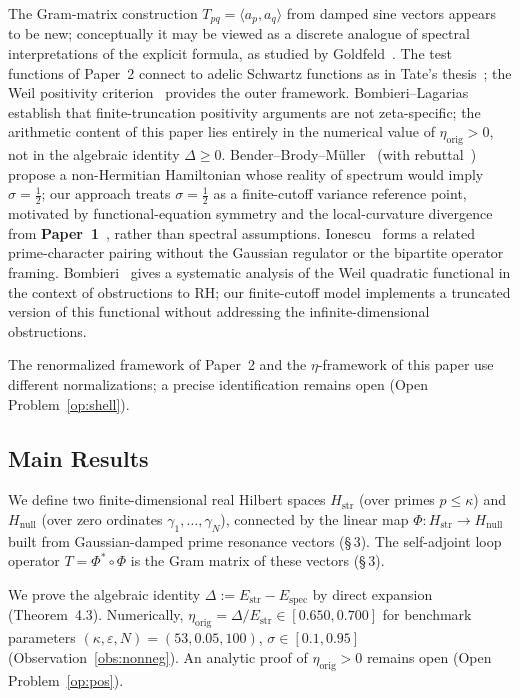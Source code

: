 \documentclass[11pt]{article}
\newcommand{\Hstr}{H_{\mathrm{str}}}
\newcommand{\Hnull}{H_{\mathrm{null}}}
\newcommand{\Estr}{E_{\mathrm{str}}}
\newcommand{\Espec}{E_{\mathrm{spec}}}
\newcommand{\etaorig}{\eta_{\mathrm{orig}}}
\begin{document}
The Gram-matrix construction $T_{pq}=\langle a_p,a_q\rangle$ from
damped sine vectors appears to be new; conceptually it may be viewed
as a discrete analogue of spectral interpretations of the explicit
formula, as studied by Goldfeld~\cite{Goldfeld}. The test functions of
Paper~2 connect to adelic Schwartz functions as in Tate's
thesis~\cite{Tate}; the Weil positivity criterion~\cite{Weil,Lagarias}
provides the outer framework.
Bombieri--Lagarias~\cite{BombieriLagarias99} establish that
finite-truncation positivity arguments are not zeta-specific;
the arithmetic content of this paper lies entirely in the numerical
value of $\etaorig>0$, not in the algebraic identity $\Delta\geq0$.
Bender--Brody--M\"uller~\cite{BenderBrodyMuller17} (with
rebuttal~\cite{Bellissard17}) propose a non-Hermitian Hamiltonian
whose reality of spectrum would imply $\sigma=\tfrac12$; our
approach treats $\sigma=\tfrac12$ as a finite-cutoff variance
reference point, motivated by functional-equation symmetry and
the local-curvature divergence from \textbf{Paper~1}~\cite{Paper1},
rather than spectral assumptions.
Ionescu~\cite{Ionescu19} forms a related prime-character pairing
without the Gaussian regulator or the bipartite operator framing.
Bombieri~\cite{Bombieri2000} gives a systematic analysis of the
Weil quadratic functional in the context of obstructions to RH;
our finite-cutoff model implements a truncated version of this
functional without addressing the infinite-dimensional obstructions.

The renormalized framework of Paper~2 and the $\eta$-framework of
this paper use different normalizations; a precise identification
remains open (Open Problem~\ref{op:shell}).

\subsection{Main Results}

We define two finite-dimensional real Hilbert spaces $\Hstr$ (over
primes $p\le\kappa$) and $\Hnull$ (over zero ordinates
$\gamma_1,\ldots,\gamma_N$), connected by the linear map
$\Phi:\Hstr\to\Hnull$ built from Gaussian-damped prime resonance
vectors (\S\,3). The self-adjoint loop operator $T=\Phi^*\circ\Phi$
is the Gram matrix of these vectors (\S\,3).

We prove the algebraic identity $\Delta:=\Estr-\Espec$ by direct
expansion (Theorem~4.3). Numerically, $\etaorig=\Delta/\Estr\in
[0.650,0.700]$ for benchmark parameters
$(\kappa,\varepsilon,N)=(53,0.05,100)$, $\sigma\in[0.1,0.95]$
(Observation~\ref{obs:nonneg}). An analytic proof of $\etaorig>0$ remains open
(Open Problem~\ref{op:pos}).
\end{document}
